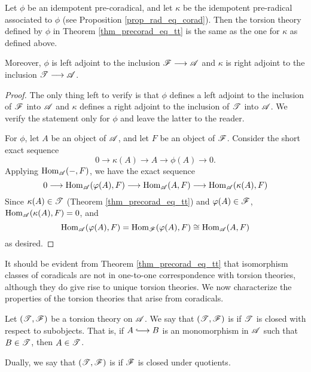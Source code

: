 \begin{cor}\label{cor_tt_ref_and_coref}
Let $\phi$ be an idempotent pre-coradical, and let $\kappa$ be the 
idempotent pre-radical associated to $\phi$ (see Proposition
\ref{prop_rad_eq_corad}). Then the torsion theory defined by $\phi$
in Theorem \ref{thm_precorad_eq_tt} is the same as the one for
$\kappa$ as defined above.

Moreover, $\phi$ is left adjoint to the inclusion $\mathscr{F} \longrightarrow 
\mathscr{A}$ and $\kappa$ is right adjoint to the inclusion $\mathscr{T} 
\longrightarrow \mathscr{A}$.
\end{cor}
\begin{proof}
The only thing left to verify is that $\phi$ defines a left 
adjoint to the inclusion of $\mathscr{F}$ into $\mathscr{A}$ and $\kappa$ 
defines a right adjoint to the inclusion of $\mathscr{T}$ into 
$\mathscr{A}$. We verify the statement only for $\phi$ and leave the 
latter to the reader.  

For $\phi$, let $A$ be an object of $\mathscr{A}$, and let $F$ be an 
object of $\mathscr{F}$. Consider the short exact sequence
\[
0 \to \kappa(A) \to A \to \phi(A) \to 0.
\]
Applying $\mathrm{Hom}_{\mathscr{A}}(-, F)$, we have the exact sequence
\[
0 \longrightarrow \mathrm{Hom}_{\mathscr{A}}(\varphi(A), F) \longrightarrow \mathrm{Hom}_{\mathscr{A}}(A, F) \longrightarrow
\mathrm{Hom}_{\mathscr{A}}(\kappa(A), F)
\]
Since $\kappa(A) \in \mathscr{T}$ (Theorem \ref{thm_precorad_eq_tt}) 
and $\varphi(A) \in \mathscr{F}$, $\mathrm{Hom}_{\mathscr{A}}(\kappa(A), F) = 0$, and
\[
\mathrm{Hom}_{\mathscr{A}}(\varphi(A), F) = \mathrm{Hom}_{\mathscr{F}}(\varphi(A), F) \cong
   \mathrm{Hom}_{\mathscr{A}}(A, F)
\]
as desired.
\end{proof}

It should be evident from Theorem \ref{thm_precorad_eq_tt} that isomorphism
classes of
coradicals are not in one-to-one correspondence with torsion theories,
although they do give rise to unique torsion theories. We now
characterize the properties of the torsion theories that arise from
coradicals.

\begin{defn}
Let $(\mathscr{T}, \mathscr{F})$ be a torsion theory on $\mathscr{A}$. We say 
that $(\mathscr{T}, \mathscr{F})$ is  if $\mathscr{T}$ is 
closed with respect to subobjects. That is, if $A \into B$ is an 
monomorphism in $\mathscr{A}$ such that $B \in \mathscr{T}$, then $A \in 
\mathscr{T}$.

Dually, we say that $(\mathscr{T}, \mathscr{F})$ is  if
$\mathscr{F}$ is closed under quotients.
\end{defn}

